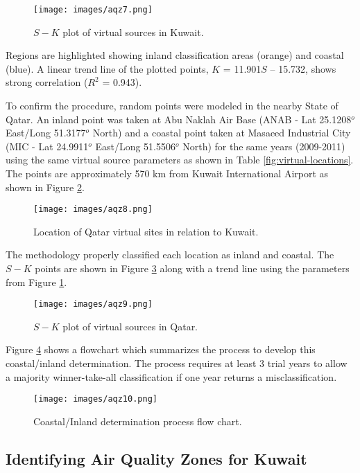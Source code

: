 %
%
\begin{figure}[H]
\texttt{[image: images/aqz7.png]} 
\caption{$S-K$ plot of virtual sources in Kuwait.}
\label{fig:SKplotKuwait}
\end{figure}
%

Regions are highlighted showing inland classification areas (orange) and coastal (blue). A linear trend line of the plotted points, $K$ = 11.901$S$ – 15.732, shows strong correlation ($R^{2}$ = 0.943).

To confirm the procedure, random points were modeled in the nearby State of Qatar. An inland point was taken at Abu Naklah Air Base (ANAB - Lat 25.1208$^{o}$ East/Long 51.3177$^{o}$ North) and a coastal point taken at Masaeed Industrial City (MIC - Lat 24.9911$^{o}$ East/Long 51.5506$^{o}$ North) for the same years (2009-2011) using the same virtual source parameters as shown in Table \ref{fig:virtual-locations}. The points are approximately 570 km from Kuwait International Airport as shown in Figure \ref{fig:qatarlocs}. 

%
\begin{figure}[H]
\texttt{[image: images/aqz8.png]} 
\caption{Location of Qatar virtual sites in relation to Kuwait.}
\label{fig:qatarlocs}
\end{figure}
%

The methodology properly classified each location as inland and coastal.  The $S-K$ points are shown in Figure \ref{fig:SKplotQatar} along with a trend line using the parameters from Figure \ref{fig:SKplotKuwait}.

%
\begin{figure}[H]
\texttt{[image: images/aqz9.png]} 
\caption{$S-K$ plot of virtual sources in Qatar.}
\label{fig:SKplotQatar}
\end{figure}
%

Figure \ref{fig:flowchart} shows a flowchart which summarizes the process to develop this coastal/inland determination.  The process requires at least 3 trial years to allow a majority winner-take-all classification if one year returns a misclassification.

%
\begin{figure}[H]
\texttt{[image: images/aqz10.png]} 
\caption{Coastal/Inland determination process flow chart.}
\label{fig:flowchart}
\end{figure}
%

\subsection{Identifying Air Quality Zones for Kuwait}

